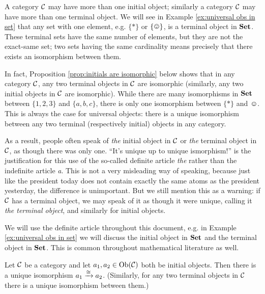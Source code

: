 \begin{warning}

A category $\mathcal{C}$ may have more than one initial object; similarly a category $\mathcal{C}$ may have more than one terminal object. We will see in Example \ref{ex:universal obs in set} that any set with one element, e.g. $\{*\}$ or $\singleton$, is a terminal object in ${\bf Set}$. These terminal sets have the same number of elements, but they are not the exact-same set; two sets having the same cardinality means precisely that there exists an isomorphism between them.

In fact, Proposition \ref{prop:initials are isomorphic} below shows that in any category $\mathcal{C}$, any two terminal objects in $\mathcal{C}$ are isomorphic (similarly, any two initial objects in $\mathcal{C}$ are isomorphic). While there are many isomorphisms in ${\bf Set}$ between $\{1,2,3\}$ and $\{a,b,c\}$, there is only one isomorphism between $\{*\}$ and $\smiley$. This is always the case for universal objects: there is a unique isomorphism between any two terminal (respectively initial) objects in any category.

As a result, people often speak of {\em the} initial object in $\mathcal{C}$ or {\em the} terminal object in $\mathcal{C}$, as though there was only one. “It's unique up to unique ismorphism!” is the justification for this use of the so-called definite article {\em the} rather than the indefinite article {\em a}. This is not a very misleading way of speaking, because just like the president today does not contain exactly the same atoms as the president yesterday, the difference is unimportant. But we still mention this as a warning: if $\mathcal{C}$ has a terminal object, we may speak of it as though it were unique, calling it {\em the terminal object}, and similarly for initial objects.

We will use the definite article throughout this document, e.g. in Example \ref{ex:universal obs in set} we will discuss the initial object in ${\bf Set}$ and the terminal object in ${\bf Set}$. This is common throughout mathematical literature as well.

\end{warning}

\begin{proposition}\label{prop:initials are isomorphic}

Let $\mathcal{C}$ be a category and let $a_1,a_2\in\textnormal{Ob}(\mathcal{C})$ both be initial objects. Then there is a unique isomorphism $a_1\xrightarrow{\cong}a_2$. (Similarly, for any two terminal objects in $\mathcal{C}$ there is a unique isomorphism between them.) 

\end{proposition}

